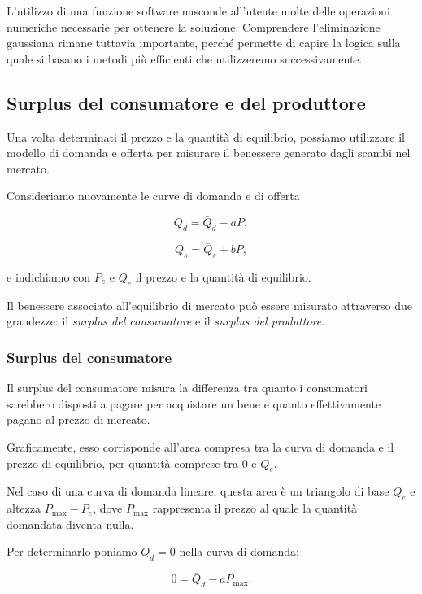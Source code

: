 L'utilizzo di una funzione software nasconde all'utente molte delle
operazioni numeriche necessarie per ottenere la soluzione. Comprendere
l'eliminazione gaussiana rimane tuttavia importante, perché permette
di capire la logica sulla quale si basano i metodi più efficienti
che utilizzeremo successivamente.

\subsection{Surplus del consumatore e del produttore}

Una volta determinati il prezzo e la quantità di equilibrio,
possiamo utilizzare il modello di domanda e offerta per misurare
il benessere generato dagli scambi nel mercato.

Consideriamo nuovamente le curve di domanda e di offerta

\begin{equation*}
Q_d = \bar Q_d-aP,
\end{equation*}

\begin{equation*}
Q_s = \bar Q_s+bP,
\end{equation*}

e indichiamo con $P_e$ e $Q_e$ il prezzo e la quantità di
equilibrio.

Il benessere associato all'equilibrio di mercato può essere
misurato attraverso due grandezze: il \emph{surplus del
consumatore} e il \emph{surplus del produttore}.


\subsubsection{Surplus del consumatore}

Il surplus del consumatore misura la differenza tra quanto i
consumatori sarebbero disposti a pagare per acquistare un bene
e quanto effettivamente pagano al prezzo di mercato.

Graficamente, esso corrisponde all'area compresa tra la curva
di domanda e il prezzo di equilibrio, per quantità comprese
tra $0$ e $Q_e$.

Nel caso di una curva di domanda lineare, questa area è un
triangolo di base $Q_e$ e altezza $P_{\max}-P_e$,
dove $P_{\max}$ rappresenta il prezzo al quale la quantità
domandata diventa nulla.

Per determinarlo poniamo $Q_d=0$ nella curva di domanda:

\begin{equation*}
0=\bar Q_d-aP_{\max}.
\end{equation*}

